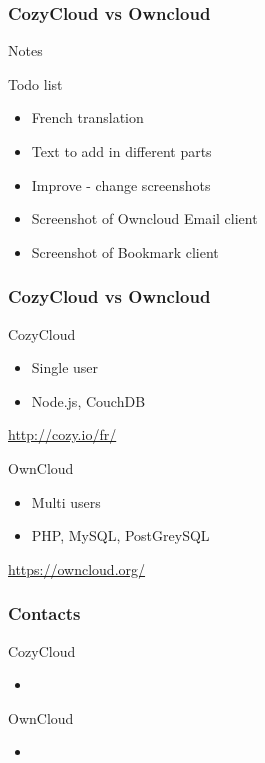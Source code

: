 \documentclass{beamer}
\begin{document}
\begin{frame}
\frametitle{CozyCloud vs Owncloud}

\begin{block}{Notes}
\end{block}

\begin{block}{Todo list}
\begin{itemize}
\item French translation
\item Text to add in different parts
\item Improve - change screenshots
\item Screenshot of Owncloud Email client
\item Screenshot of Bookmark client
\end{itemize}
\end{block}
\end{frame}

\begin{frame}
\frametitle{CozyCloud vs Owncloud}

\begin{block}{CozyCloud}
\begin{itemize}
\item Single user
\item Node.js, CouchDB
\end{itemize}
\url{http://cozy.io/fr/}
\end{block}

\begin{block}{OwnCloud}
\begin{itemize}
\item Multi users
\item PHP, MySQL, PostGreySQL
\end{itemize}
\url{https://owncloud.org/}
\end{block}
\end{frame}

\begin{frame}
\frametitle{Contacts}

\begin{block}{CozyCloud}
\begin{itemize}
\item 
\end{itemize}
\end{block}

\begin{block}{OwnCloud}
\begin{itemize}
\item 
\end{itemize}
\end{block}
\end{frame}
\end{document}

